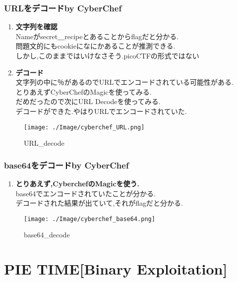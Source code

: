 \documentclass[dvipdfmx]{jsarticle}
\begin{document}
\subsubsection{URLをデコードby CyberChef}
\begin{enumerate}
	\item \textbf{文字列を確認}\\
	Nameがsecret＿recipeとあることからflagだと分かる.\\
	問題文的にもcookieになにかあることが推測できる.\\
	しかし,このままではいけなさそう.picoCTF{}の形式ではない
	\item \textbf{デコード}\\
	文字列の中に％があるのでURLでエンコードされている可能性がある.\\
	とりあえずCyberChefのMagicを使ってみる.\\
	だめだったので次にURL Decodeを使ってみる.\\
	デコードができた.やはりURLでエンコードされていた.\\
\end{enumerate}

\begin{figure}[h]
\begin{center}
\texttt{[image: ./Image/cyberchef\_URL.png]}
\caption{URL\_decode}
\end{center}
\end{figure}


\subsubsection{base64をデコードby CyberChef}
\begin{enumerate}
	\item \textbf{とりあえず,CyberchefのMagicを使う.}\\
	base64でエンコードされていたことが分かる.\\
	デコードされた結果が出ていて,それがflagだと分かる.
\end{enumerate}

\begin{figure}[t]
\begin{center}
\texttt{[image: ./Image/cyberchef\_base64.png]}
\caption{base64\_decode}
\end{center}
\end{figure}
\FloatBarrier

\section{PIE TIME[Binary Exploitation]}
\end{document}
